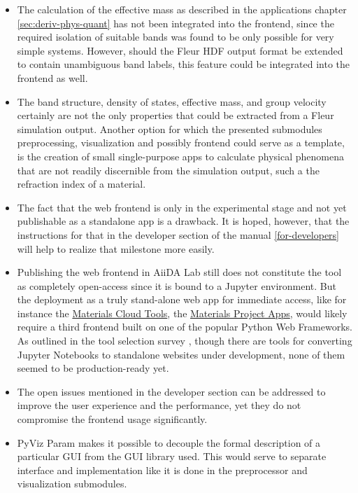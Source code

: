 \begin{itemize}
\begin{itemize}
    \item The calculation of the effective mass as described in the applications
        chapter \vref{sec:deriv-phys-quant} has not been integrated into the
        frontend, since the required isolation of suitable bands was found to be
        only possible for very simple systems. However, should the Fleur HDF
        output format be extended to contain unambiguous band labels, this
        feature could be integrated into the frontend as well.
    \item The band structure, density of states, effective mass, and group
        velocity certainly are not the only properties that could be extracted
        from a Fleur simulation output. Another option for which the presented
        submodules preprocessing, visualization and possibly frontend could
        serve as a template, is the creation of small single-purpose apps to
        calculate physical phenomena that are not readily discernible from the
        simulation output, such a the refraction index of a material.
    \item The fact that the web frontend is only in the experimental stage and
        not yet publishable as a standalone app is a drawback. It is hoped,
        however, that the instructions for that in the developer section of the
        manual \vref{for-developers} will help to realize that milestone more
        easily.
    \item Publishing the web frontend in AiiDA Lab still does not constitute the
        tool as completely open-access since it is bound to a Jupyter
        environment. But the deployment as a truly stand-alone web app for
        immediate access, like for instance the
        \href{https://www.materialscloud.org/work/menu}{Materials Cloud Tools},
        the \href{https://materialsproject.org/}{Materials Project Apps}, would
        likely require a third frontend built on one of the popular Python Web
        Frameworks. As outlined in the tool selection survey \cite{jw-notes},
        though there are tools for converting Jupyter Notebooks to standalone
        websites under development, none of them seemed to be production-ready
        yet.
    \item The open issues mentioned in the developer section can be
        addressed to improve the user experience and the performance, yet they
        do not compromise the frontend usage significantly.
    \item PyViz Param \cite{pyviz-param} makes it possible to decouple the
        formal description of a particular GUI from the GUI library used. This
        would serve to separate interface and implementation like it is done in
        the preprocessor and visualization submodules.
    \end{itemize}
\end{itemize}


